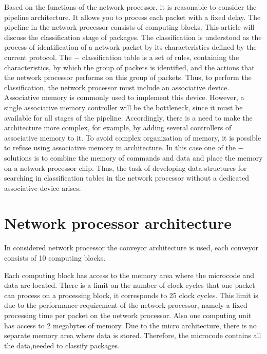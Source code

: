 \documentclass[conference]{IEEEtran}
\begin{document}
		Based on the functions of the network processor, it is reasonable to consider the pipeline architecture. 
		It allows you to process each packet with a fixed delay. 
        The pipeline in the network processor consists of computing blocks. 
        This article will discuss the classification stage of packages.
        The classification is understood as the process of identification of a network packet 
        by its characteristics defined by the current protocol.
        The $-$ classification table is a set of rules, containing the characteristics, 
        by which the group of packets is identified,
        and the actions that the network processor performs on this group of packets. 
        Thus, to perform the classification, the network processor must include an associative device. 
		Associative memory is commonly used to implement this device.
        However, a single associative memory controller will be the bottleneck, 
        since it must be available for all stages of the pipeline.
        Accordingly, there is a need to make the architecture more complex, 
        for example, by adding several controllers of associative memory to it.
        To avoid complex organization of memory, it is possible to refuse using associative memory in architecture. 
        In this case one of the $-$ solutions is to combine the memory of commands 
        and data and place the memory on a network processor chip.
        Thus, the task of developing data structures for searching in classification 
        tables in the network processor without a dedicated associative device arises.

    \section{Network processor architecture}
        \label{section:problem}
        In considered network processor the conveyor architecture is used, each conveyor consists of 10 computing blocks. 
         
        Each computing block has access to the memory area where the microcode and data are located.
        There is a limit on the number of clock cycles that one packet can process on a processing block, 
        it corresponds to 25 clock cycles.
        This limit is due to the performance requirement of the network processor, 
        namely a fixed processing time per packet on the network processor.
        Also one computing unit has access to 2 megabytes of memory.
        Due to the micro architecture, there is no separate memory area where data is stored. 
        Therefore, the microcode contains all the data,needed to classify packages.
\end{document}
